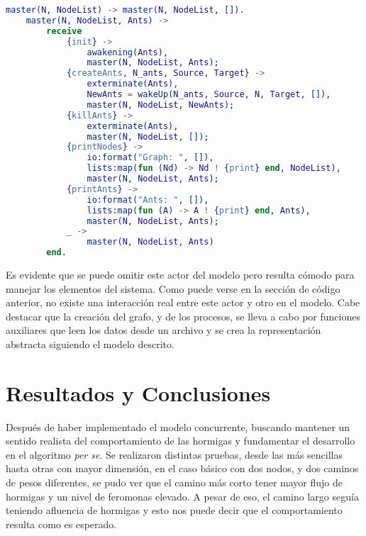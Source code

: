 \documentclass[
12pt, %
letterpaper, %
oneside, %
headinclude,footinclude, %
BCOR5mm, %
]{scrartcl}
\begin{document}
\begin{lstlisting}[language=Erlang]
    master(N, NodeList) -> master(N, NodeList, []).
    master(N, NodeList, Ants) ->
        receive
            {init} ->
                awakening(Ants),
                master(N, NodeList, Ants);
            {createAnts, N_ants, Source, Target} ->
                exterminate(Ants),
                NewAnts = wakeUp(N_ants, Source, N, Target, []),
                master(N, NodeList, NewAnts);
            {killAnts} ->
                exterminate(Ants),
                master(N, NodeList, []);
            {printNodes} ->
                io:format("Graph: ", []),
                lists:map(fun (Nd) -> Nd ! {print} end, NodeList),
                master(N, NodeList, Ants);
            {printAnts} ->
                io:format("Ants: ", []),
                lists:map(fun (A) -> A ! {print} end, Ants),
                master(N, NodeList, Ants);
            _ ->
                master(N, NodeList, Ants)
        end.
\end{lstlisting}

Es evidente que se puede omitir este actor del modelo pero resulta cómodo para manejar los elementos del sistema. Como puede verse en la sección de código anterior, no existe una interacción real entre este actor y otro en el modelo. Cabe destacar que la creación del grafo, y de los procesos, se lleva a cabo por funciones auxiliares que leen los datos desde un archivo y se crea la representación abstracta siguiendo el modelo descrito. 


\section{Resultados y Conclusiones}

Después de haber implementado el modelo concurrente, buscando mantener un sentido realista del comportamiento de las hormigas y fundamentar el desarrollo en el algoritmo \emph{per se}. Se realizaron distintas pruebas, desde las más sencillas hasta otras con mayor dimensión, en el caso básico con dos nodos, y dos caminos de pesos diferentes, se pudo ver que el camino más corto tener mayor flujo de hormigas y un nivel de feromonas elevado. A pesar de eso, el camino largo seguía teniendo afluencia de hormigas y esto nos puede decir que el comportamiento resulta como es esperado.
\end{document}
